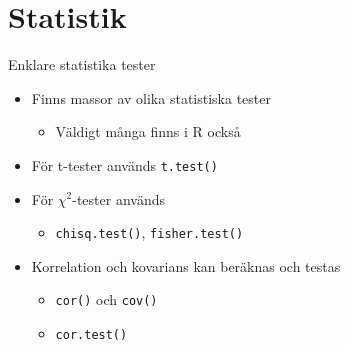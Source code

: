 \documentclass[
  11pt,
  ignorenonframetext,
  handout]{beamer}
\providecommand{\tightlist}{%
  \setlength{\itemsep}{0pt}\setlength{\parskip}{0pt}}
\begin{document}
\section{Statistik}\label{statistik}

\begin{frame}{Enklare statistika tester}
\protect{}\label{enklare-statistika-tester}
\begin{itemize}
\tightlist
\item
  Finns massor av olika statistiska tester

  \begin{itemize}
  \tightlist
  \item
    Väldigt många finns i R också
  \end{itemize}
\item
  För t-tester används \texttt{t.test()}
\item
  För \(\chi^2\)-tester används

  \begin{itemize}
  \tightlist
  \item
    \texttt{chisq.test()}, \texttt{fisher.test()}
  \end{itemize}
\item
  Korrelation och kovarians kan beräknas och testas

  \begin{itemize}
  \tightlist
  \item
    \texttt{cor()} och \texttt{cov()}
  \item
    \texttt{cor.test()}
  \end{itemize}
\end{itemize}
\end{frame}
\end{document}
